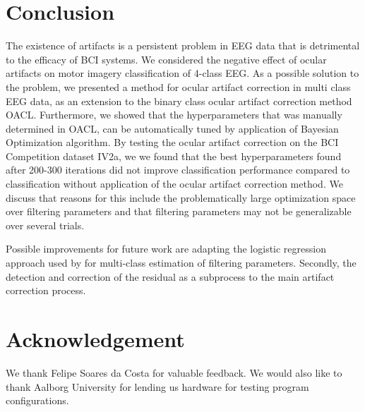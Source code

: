 \section{Conclusion}
The existence of artifacts is a persistent problem in EEG data that is detrimental to the efficacy of BCI systems. We considered the negative effect of ocular artifacts on motor imagery classification of 4-class EEG. As a possible solution to the problem, we presented a method for ocular artifact correction in multi class EEG data, as an extension to the binary class ocular artifact correction method OACL\citep{li2015ocular}. Furthermore, we showed that the hyperparameters that was manually determined in OACL, can be automatically tuned by application of Bayesian Optimization algorithm. By testing the ocular artifact correction on the BCI Competition dataset IV2a, we  we found that the best hyperparameters found after 200-300 iterations did not improve classification performance compared to classification without application of the ocular artifact correction method. We discuss that reasons for this include the problematically large optimization space over filtering parameters and that filtering parameters may not be generalizable over several trials.

Possible improvements for future work are adapting the logistic regression approach used by \citep{li2015ocular} for multi-class estimation of filtering parameters. Secondly, the detection and correction of the residual as a subprocess to the main artifact correction process. 

\section{Acknowledgement}
We thank Felipe Soares da Costa for valuable feedback. We would also like to thank Aalborg University for lending us hardware for testing program configurations.